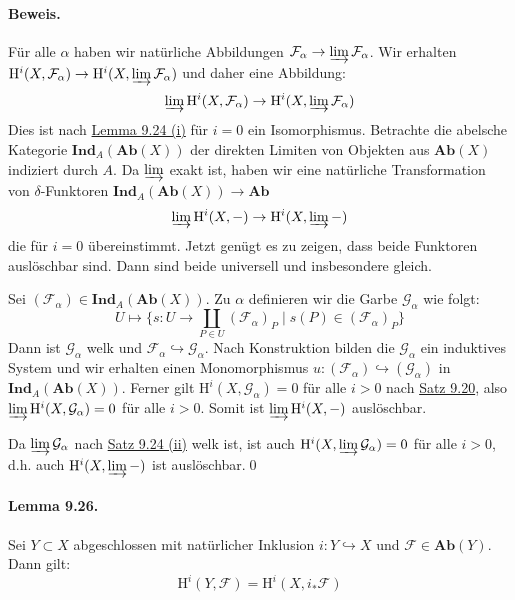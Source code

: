 \paragraph{Beweis.} Für alle $\alpha$ haben wir natürliche Abbildungen $\mathcal{F}_\alpha\to\varinjlim\mathcal{F}_\alpha$. Wir erhalten $\mathrm{H}^i(X,\mathcal{F}_\alpha)\to\mathrm{H}^i(X,\varinjlim\mathcal{F}_\alpha)$ und daher eine Abbildung:
\[\varinjlim\mathrm{H}^i(X,\mathcal{F}_\alpha)\to\mathrm{H}^i(X,\varinjlim\mathcal{F}_\alpha) \]
Dies ist nach \hyperref[9.24]{Lemma 9.24 (i)} für $i=0$ ein Isomorphismus. Betrachte die abelsche Kategorie $\mathbf{Ind}_A(\mathbf{Ab}(X))$ der direkten Limiten von Objekten aus $\mathbf{Ab}(X)$ indiziert durch $A$. Da $\varinjlim$ exakt ist, haben wir eine natürliche Transformation von $\delta$-Funktoren $\mathbf{Ind}_A(\mathbf{Ab}(X))\to\mathbf{Ab}$
\[\varinjlim\mathrm{H}^i(X,-)\to\mathrm{H}^i(X,\varinjlim -) \]
die für $i=0$ übereinstimmt. Jetzt genügt es zu zeigen, dass beide Funktoren auslöschbar sind. Dann sind beide universell und insbesondere gleich.

Sei $(\mathcal{F}_\alpha)\in\mathbf{Ind}_A(\mathbf{Ab}(X))$. Zu $\alpha$ definieren wir die Garbe $\mathcal{G}_\alpha$ wie folgt:
\[U\mapsto \Big\{s:U\to\coprod_{P\in U}(\mathcal{F}_\alpha)_P\mid s(P)\in (\mathcal{F}_\alpha)_P \Big\} \]
Dann ist $\mathcal{G}_\alpha$ welk und $\mathcal{F}_\alpha\hookrightarrow\mathcal{G}_\alpha$. Nach Konstruktion bilden die $\mathcal{G}_\alpha$ ein induktives System und wir erhalten einen Monomorphismus $u:(\mathcal{F}_\alpha)\hookrightarrow (\mathcal{G}_\alpha)$ in $\mathbf{Ind}_A(\mathbf{Ab}(X))$. Ferner gilt $\mathrm{H}^i(X,\mathcal{G}_\alpha)=0$ für alle $i>0$ nach \hyperref[9.20]{Satz 9.20}, also $\varinjlim\mathrm{H}^i(X,\mathcal{G}_\alpha)=0$ für alle $i>0$. Somit ist $\varinjlim\mathrm{H}^i(X,-)$ auslöschbar.

Da $\varinjlim\mathcal{G}_\alpha$ nach \hyperref[9.24]{Satz 9.24 (ii)} welk ist, ist auch $\mathrm{H}^i(X,\varinjlim\mathcal{G}_\alpha)=0$ für alle $i>0$, d.h. auch $\mathrm{H}^i(X,\varinjlim -)$ ist auslöschbar.\qed

\paragraph{Lemma 9.26.}\label{9.26} Sei $Y\subset X$ abgeschlossen mit natürlicher Inklusion $i:Y\hookrightarrow X$ und $\mathcal{F}\in\mathbf{Ab}(Y)$. Dann gilt:
\[\mathrm{H}^i(Y,\mathcal{F})=\mathrm{H}^i(X, i_\ast\mathcal{F}) \]

